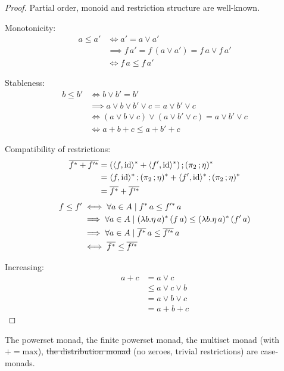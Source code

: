 \documentclass[runningheads,envcountsame]{llncs}
\begin{document}
\begin{proof}
    Partial order, monoid and restriction structure are well-known.
    
    Monotonicity:
    \begin{align}
        a \leq a' & \iff a' = a \vee a' \\
                  & \implies f\,a' = f\,(a \vee a') = f\,a \vee f\,a' \\
                  & \iff f\,a \leq f\,a'
    \end{align}
    
    Stableness:
    \begin{align}
        b \leq b' & \iff b \vee b' = b' \\
                  & \implies a \vee b \vee b' \vee c = a \vee b' \vee c \\
                  & \iff (a \vee b \vee c) \vee (a \vee b' \vee c) = a \vee b' \vee c \\
                  & \iff a + b + c \leq a + b' + c
    \end{align}
    
    Compatibility of restrictions:
    \begin{align}
        \overline{f^* + f'^*} &= \comp{(\langle f, \id \rangle^* + \langle f', \id \rangle^*)}{(\comp{\pi_2}{\munit})^*} \\
             &= \comp{\langle f, \id \rangle^*}{(\comp{\pi_2}{\munit})^*} + \comp{\langle f', \id \rangle^*}{(\comp{\pi_2}{\munit})^*} \\
             &= \overline{f^*} + \overline{f'^*}
    \end{align}
    \begin{align}
        f \leq f' & \iff \forall a \in A \mid f^*\,a \leq f'^*\,a \\
            & \implies \forall a \in A \mid (\lambda b. \munit\,a)^*\,(f\,a) \leq (\lambda b. \munit\,a)^*\,(f'\,a) \\
            & \implies \forall a \in A \mid \overline{f^*}\,a \leq \overline{f'^*}\,a \\
            & \iff \overline{f^*} \leq \overline{f'^*}
    \end{align}
    
    Increasing:
    \begin{align}
        a + c & = a \vee c \\
              & \leq a \vee c \vee b \\
              & = a \vee b \vee c \\
              & = a + b + c
    \end{align}
\end{proof}
\begin{corollary}
    The powerset monad, the finite powerset monad, the multiset monad (with ${+} = \mathrm{max}$), \sout{the distribution monad} (no zeroes, trivial restrictions) are case-monads.
\end{corollary}
\end{document}

